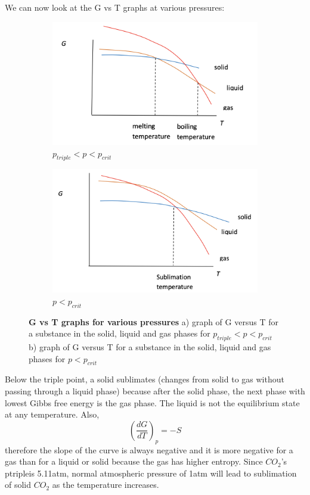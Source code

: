\documentclass[11pt]{report}
\begin{document}
 We can now look at the G vs T graphs at various pressures:
\begin{figure}
    \centering
    \begin{subfigure}{1.0\textwidth}
        \centering
        \includegraphics[width=0.7\linewidth]{ptrip.p.pcrit.png}
        \caption{$p_{triple}<p<p_{crit}$}
        \label{fig:sub1}
    \end{subfigure}
    \begin{subfigure}{1.0\textwidth}
        \centering
        \includegraphics[width=0.7\linewidth]{p.ptriple.png}
        \caption{$p<p_{crit}$}
        \label{fig:sub2}
    \end{subfigure}
\caption{\textbf{G vs T graphs for various pressures}
a) graph of G versus T for a substance in the solid, liquid and gas phases for $p_{triple}<p<p_{crit}$
b) graph of G versus T for a substance in the solid, liquid and gas phases for $p<p_{crit}$
}
\label{fig:test}
\end{figure}

Below the triple point, a solid sublimates (changes from solid to gas without passing through a liquid phase) because after the solid phase, the next phase with lowest Gibbs free energy is the gas phase. The liquid is not the equilibrium state at any temperature.
Also, $$\left(\frac{dG}{dT}\right)_p=-S$$ therefore the slope of the curve is always negative and it is more negative for a gas than for a liquid or solid because the gas has higher entropy.			
Since $CO_2$’s ptripleis 5.11atm, normal atmospheric pressure of 1atm will lead to sublimation of solid $CO_2$ as the temperature increases. 
\end{document}
